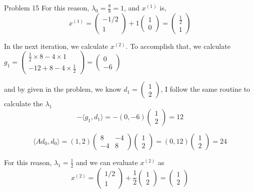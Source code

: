 \documentclass[12pt]{article}
\begin{document}
\begin{section}{Problem 15}
	For this reason, $\lambda_0 = \frac{8}{8}=1$, and $x^{(1)}$ is, 
	\[x^{(1)} = \begin{pmatrix}
	-1/2\\
	1
	\end{pmatrix} + 1 \begin{pmatrix}
	1\\
	0
	\end{pmatrix} = \begin{pmatrix}
	\frac{1}{2}\\
	1
	\end{pmatrix} \]
	
	In the next iteration, we calculate $x^{(2)}$. To accomplish that, we calculate $g_1 = \begin{pmatrix}
	\frac{1}{2} \times 8 - 4 \times 1\\
	-12 + 8 - 4 \times \frac{1}{2}
	\end{pmatrix} = \begin{pmatrix}
	0\\
	-6
	\end{pmatrix}$
	
	and by given in the problem, we know $d_1 = \begin{pmatrix}
	1\\
	2
	\end{pmatrix}$, I follow the same routine to calculate the $\lambda_1$
	\[-\langle g_1, d_1 \rangle = -(0, -6) \begin{pmatrix}
	1\\
	2
	\end{pmatrix} = 12\] 
	
	\[\langle Ad_0, d_0 \rangle  = (1,2) \begin{pmatrix}
	8 & -4\\
	-4 & 8
	\end{pmatrix} \begin{pmatrix}
	1\\
	2
	\end{pmatrix} = (0, 12) \begin{pmatrix}
	1\\
	2
	\end{pmatrix} = 24\]
	
	For this reason, $\lambda_1 = \frac{1}{2}$ and we can evaluate $x^{(2)}$ as
	\[x^{(2)} = \begin{pmatrix}
	1/2\\
	1
	\end{pmatrix} + \frac{1}{2} \begin{pmatrix}
	1\\
	2
	\end{pmatrix} = \begin{pmatrix}
	1\\
	2
	\end{pmatrix} \]
	 

\end{section}
\end{document}
